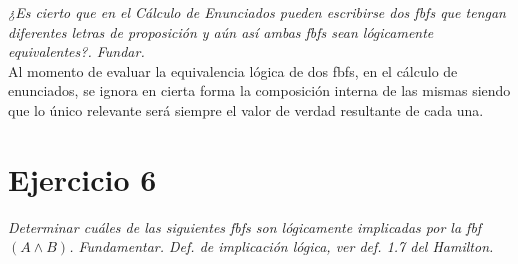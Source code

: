 \documentclass[osajnl,twocolumn,showpacs,superscriptaddress,10pt]{revtex4-1} %
\begin{document}
\textit{¿Es cierto que en el Cálculo de Enunciados pueden escribirse dos fbfs que tengan diferentes letras de proposición y aún así ambas fbfs sean lógicamente equivalentes?. Fundar.} \\

Al momento de evaluar la equivalencia lógica de dos fbfs, en el cálculo de enunciados, se ignora en cierta forma la composición interna de las mismas siendo que lo único relevante será siempre el valor de verdad resultante de cada una.

\newpage

\section{Ejercicio 6}

\textit{Determinar cuáles de las siguientes fbfs son lógicamente implicadas por la fbf $(A \wedge B)$. Fundamentar. Def. de implicación lógica, ver def. 1.7 del Hamilton.} \\
\end{document}
